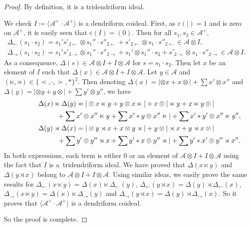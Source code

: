 \documentclass[pdftex]{sigma}
\numberwithin{equation}{section}
\theoremstyle{definition}
\theoremstyle{plain}
\begin{document}
\begin{proof}
	By definition, it is a tridendriform ideal.
		
We check $I\coloneqq\big\langle \mathcal{A}^+\cdot \mathcal{A}^+ \big\rangle$ is a dendriform coideal.
		First, as $\varepsilon(|)=1$ and is zero on $\mathcal{A}^+$, it is easily seen that $\varepsilon(I)=(0)$. Then for all $s_1,s_2\in \mathcal{A}^+$,
		\begin{gather*}
			\Delta_{\leftarrow}(s_1\cdot s_2)
			=s_1's'_{2 \leftarrow}\otimes s_1''\cdot s''_{2\leftarrow}+s'_{2 \leftarrow}\otimes s_1\cdot s''_{2 \leftarrow} \in \mathcal{A}\otimes I, \\
			\Delta_{\rightarrow}(s_1\cdot s_2)
=s_1's'_{2 \rightarrow}\otimes s_1''\cdot s''_{2 \rightarrow}+s_1'\otimes s_1''\cdot s_2+s'_{2 \rightarrow}\otimes s_1\cdot s''_{2 \rightarrow}\in \mathcal{A}\otimes I.
		\end{gather*}
		As a consequence, $\Delta(s)\in \mathcal{A}\otimes I + I\otimes \mathcal{A}$ for $s=s_1\cdot s_2$. Then let $x$ be an element of $I$ such that $\Delta(x)\in \mathcal{A}\otimes I+I\otimes \mathcal{A}$. Let $y\in \mathcal{A}$ and $(\ltimes,\rtimes)\in\{\prec,\cdot,\succ,*\}^2$. Then denoting $\Delta(x)=|\otimes x+x\otimes |+\sum x'\otimes x''$ and $\Delta(y)=|\otimes y+y\otimes |+\sum y'\otimes y''$, we have
		\begin{gather*}
			\Delta(x)\ltimes \Delta(y) =|\otimes x\ltimes y+y\otimes x\ltimes |+x\otimes |\ltimes y+x\ltimes y\otimes |\\
			 \hphantom{\Delta(x)\ltimes \Delta(y) =}{}+\sum x'\otimes x''\ltimes y+\sum x'*y\otimes x''\ltimes |+\sum x'*y'\otimes x''\ltimes y'', \\
			\Delta(y)\rtimes\Delta(x) =|\otimes y\rtimes x+x\otimes y\rtimes |+y\otimes |\rtimes x+y\rtimes x\otimes |\\
			 \hphantom{\Delta(y)\rtimes\Delta(x) =}{}+\sum y'\otimes y''\rtimes x+\sum y'*x\otimes y''\rtimes |+\sum y'*x'\otimes y''\rtimes x''.
		\end{gather*}
		In both expressions, each term is either $0$ or an element of $\mathcal{A}\otimes I+I\otimes \mathcal{A}$ using the fact that $I$ is a~tridendriform ideal. We have proved that $\Delta(x\ltimes y)$ and $\Delta(y\rtimes x)$ belong to $\mathcal{A}\otimes I+I\otimes \mathcal{A}$. Using similar ideas, we easily prove the same results for $\Delta_{\leftarrow}(x\ltimes y)=\Delta(x)\ltimes \Delta_{\leftarrow}(y)$, $\Delta_{\leftarrow}(y\rtimes x)=\Delta(y)\rtimes \Delta_{\leftarrow}(x)$, $\Delta_{\rightarrow}(x\ltimes y)=\Delta(x)\ltimes \Delta_{\rightarrow}(y)$ and $\Delta_{\rightarrow}(y\rtimes x)=\Delta(y)\rtimes \Delta_{\rightarrow}(x)$. So it proves that $\big\langle \mathcal{A}^+ \cdot \mathcal{A}^+\big\rangle$ is a dendriform coideal.

So the proof is complete.
\end{proof}
\end{document}
